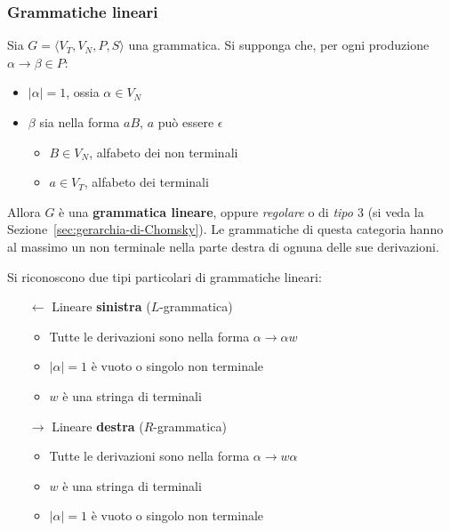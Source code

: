 \documentclass[italian, 10pt]{article}
\begin{document}
\subsubsection{Grammatiche lineari}

Sia \(G = \langle V_T, V_N, P, S \rangle\) una grammatica.
Si supponga che, per ogni produzione \(\alpha \rightarrow \beta \in P\):

\begin{itemize}
  \item \(|\alpha| = 1\), ossia \(\alpha \in V_N\)
  \item \(\beta\) sia nella forma \(aB\), \(a\) può essere \(\epsilon\)
        \begin{itemize}
          \item \(B \in V_N\), alfabeto dei non terminali
          \item \(a \in V_T\), alfabeto dei terminali
        \end{itemize}
\end{itemize}

Allora \(G\) è una \textbf{grammatica lineare}, oppure \textit{regolare} o di \textit{tipo \(3\)} (si veda la Sezione~\ref{sec:gerarchia-di-Chomsky}).
Le grammatiche di questa categoria hanno al massimo un non terminale nella parte destra di ognuna delle sue derivazioni.

\bigskip
Si riconoscono due tipi particolari di grammatiche lineari:

\begin{itemize}
  \item[\(\leftarrow\)] Lineare \textbf{sinistra} (\(L\)-grammatica)
    \begin{itemize}
      \item Tutte le derivazioni sono nella forma \(\alpha \rightarrow \alpha w\)
      \item \(|\alpha| = 1\) è vuoto o singolo non terminale
      \item \(w\) è una stringa di terminali
    \end{itemize}
  \item[\(\rightarrow\)] Lineare \textbf{destra} (\(R\)-grammatica)
    \begin{itemize}
      \item Tutte le derivazioni sono nella forma \(\alpha \rightarrow w \alpha \)
      \item \(w\) è una stringa di terminali
      \item \(|\alpha| = 1\) è vuoto o singolo non terminale
    \end{itemize}
\end{itemize}
\end{document}
